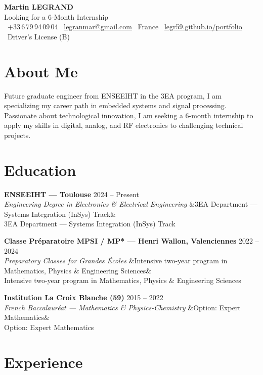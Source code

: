 \documentclass[a4paper,11pt]{article}
\newcommand{\cventry}[4]{%
  \noindent
  \textbf{#1} \hfill {\small\color{lightgray}#2} \\
  {\itshape\color{accent}#3}%
  \ifx&#4&\else\\#4\fi
  \vspace{6pt}
}
\begin{document}
\begin{center}
  {\Huge\bfseries Martin LEGRAND}\\[6pt]
  {\large\color{accent} Looking for a 6-Month Internship}\\[10pt]
  {\small
    \faPhone\ +33\,6\,79\,94\,09\,04 \quad
    \faEnvelope\ \href{mailto:legranmar@gmail.com}{legranmar@gmail.com} \quad
    \faMapMarker*\ France \quad
    \faGlobe\ \href{https://legr59.github.io/portfolio}{legr59.github.io/portfolio} \quad
    \faCar\ Driver's License (B)
  }
\end{center}

\vspace{4pt}

\section{About Me}

Future graduate engineer from ENSEEIHT in the 3EA program, I am specializing my career path in embedded systems and signal processing. Passionate about technological innovation, I am seeking a 6-month internship to apply my skills in digital, analog, and RF electronics to challenging technical projects.

\section{Education}

\cventry{ENSEEIHT — Toulouse}{2024 -- Present}
  {Engineering Degree in Electronics \& Electrical Engineering}
  {3EA Department — Systems Integration (InSys) Track}

\cventry{Classe Préparatoire MPSI / MP* — Henri Wallon, Valenciennes}{2022 -- 2024}
  {Preparatory Classes for Grandes Écoles}
  {Intensive two-year program in Mathematics, Physics \& Engineering Sciences}

\cventry{Institution La Croix Blanche (59)}{2015 -- 2022}
  {French Baccalauréat — Mathematics \& Physics-Chemistry}
  {Option: Expert Mathematics}

\section{Experience}
\end{document}
